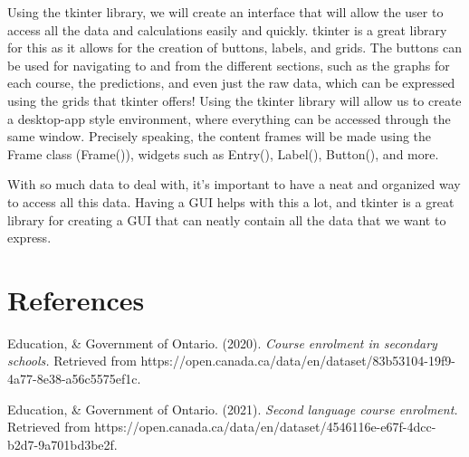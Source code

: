 \documentclass[fontsize=11pt]{article}
\begin{document}
Using the tkinter library, we will create an interface that will allow the user to access all the data and calculations easily and quickly. tkinter is a great library for this as it allows for the creation of buttons, labels, and grids. The buttons can be used for navigating to and from the different sections, such as the graphs for each course, the predictions, and even just the raw data, which can be expressed using the grids that tkinter offers! Using the tkinter library will allow us to create a desktop-app style environment, where everything can be accessed through the same window. Precisely speaking, the content frames will be made using the Frame class (Frame()), widgets such as Entry(), Label(), Button(), and more.

With so much data to deal with, it’s important to have a neat and organized way to access all this data. Having a GUI helps with this a lot, and tkinter is a great library for creating a GUI that can neatly contain all the data that we want to express.


\section*{References}

\noindent Education, \& Government of Ontario. (2020). \emph{Course enrolment in secondary schools.} Retrieved from \linebreak \indent https://open.canada.ca/data/en/dataset/83b53104-19f9-4a77-8e38-a56c5575ef1c.

\noindent Education, \& Government of Ontario. (2021). \emph{Second language course enrolment.} Retrieved from \linebreak \indent https://open.canada.ca/data/en/dataset/4546116e-e67f-4dcc-b2d7-9a701bd3be2f. 

\end{document}
